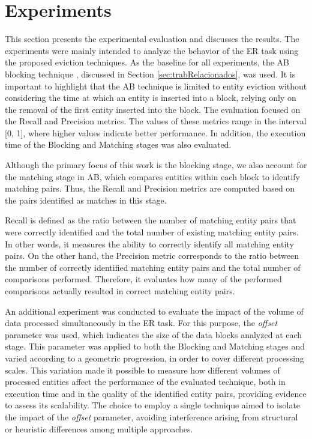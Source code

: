 \documentclass{ieeeaccess}
\begin{document}
\section{Experiments} \label{sec:avaliacao}

This section presents the experimental evaluation and discusses the results. The experiments were mainly intended to analyze the behavior of the ER task using the proposed eviction techniques. As the baseline for all experiments, the AB blocking technique \cite{10.1109/TKDE.2024.3361022}, discussed in Section \ref{sec:trabRelacionados}, was used. It is important to highlight that the AB technique is limited to entity eviction without considering the time at which an entity is inserted into a block, relying only on the removal of the first entity inserted into the block. The evaluation focused on the Recall and Precision metrics. The values of these metrics range in the interval [0, 1], where higher values indicate better performance. In addition, the execution time of the Blocking and Matching stages was also evaluated.

Although the primary focus of this work is the blocking stage, we also account for the matching stage in AB, which compares entities within each block to identify matching pairs. Thus, the Recall and Precision metrics are computed based on the pairs identified as matches in this stage.

Recall is defined as the ratio between the number of matching entity pairs that were correctly identified and the total number of existing matching entity pairs. In other words, it measures the ability to correctly identify all matching entity pairs. On the other hand, the Precision metric corresponds to the ratio between the number of correctly identified matching entity pairs and the total number of comparisons performed. Therefore, it evaluates how many of the performed comparisons actually resulted in correct matching entity pairs.

An additional experiment was conducted to evaluate the impact of the volume of data processed simultaneously in the ER task. For this purpose, the \textit{offset} parameter was used, which indicates the size of the data blocks analyzed at each stage. This parameter was applied to both the Blocking and Matching stages and varied according to a geometric progression, in order to cover different processing scales. This variation made it possible to measure how different volumes of processed entities affect the performance of the evaluated technique, both in execution time and in the quality of the identified entity pairs, providing evidence to assess its scalability. The choice to employ a single technique aimed to isolate the impact of the \textit{offset} parameter, avoiding interference arising from structural or heuristic differences among multiple approaches.
\end{document}
